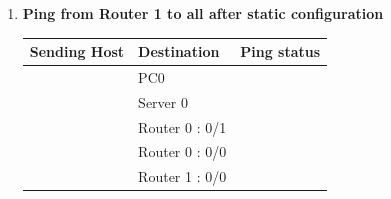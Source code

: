 \documentclass[a4paper,11pt]{article}
\begin{document}
\begin{enumerate}
\begin{enumerate}
              \item \textbf{Ping from Router 1 to all after static configuration}
                    \begin{table}[H]
                        \centering
                        \begin{tabular}{| m{9em}| m{12em}| m{9em} |}
                            \hline
                            \textbf{Sending Host}                                                & \textbf{Destination} & \textbf{Ping status}                                                     \\
                            \hline
                            {\cellcolor[rgb]{0.333,0.686,1}}                                     & PC0                  & {\cellcolor[rgb]{0.365,1,0.741}}                                         \\
                            \hhline{|>{\arrayrulecolor[rgb]{0.333,0.686,1}}->{\arrayrulecolor{black}}->{\arrayrulecolor[rgb]{0.365,1,0.741}}->{\arrayrulecolor{black}}|}
                            {\cellcolor[rgb]{0.333,0.686,1}}                                     & Server 0             & {\cellcolor[rgb]{0.365,1,0.741}}                                         \\
                            \hhline{|>{\arrayrulecolor[rgb]{0.333,0.686,1}}->{\arrayrulecolor{black}}->{\arrayrulecolor[rgb]{0.365,1,0.741}}->{\arrayrulecolor{black}}|}
                            {\cellcolor[rgb]{0.333,0.686,1}}                                     & Router 0 : 0/1       & {\cellcolor[rgb]{0.365,1,0.741}}                                         \\
                            \hhline{|>{\arrayrulecolor[rgb]{0.333,0.686,1}}->{\arrayrulecolor{black}}->{\arrayrulecolor[rgb]{0.365,1,0.741}}->{\arrayrulecolor{black}}|}
                            {\cellcolor[rgb]{0.333,0.686,1}}                                     & Router 0 : 0/0       & {\cellcolor[rgb]{0.365,1,0.741}}                                         \\
                            \hhline{|>{\arrayrulecolor[rgb]{0.333,0.686,1}}->{\arrayrulecolor{black}}->{\arrayrulecolor[rgb]{0.365,1,0.741}}->{\arrayrulecolor{black}}|}
                            {\cellcolor[rgb]{0.333,0.686,1}}                                     & Router 1 : 0/0       & {\cellcolor[rgb]{0.365,1,0.741}}                                         \\

\end{tabular}
\end{table}
\end{enumerate}
\end{enumerate}
\end{document}
